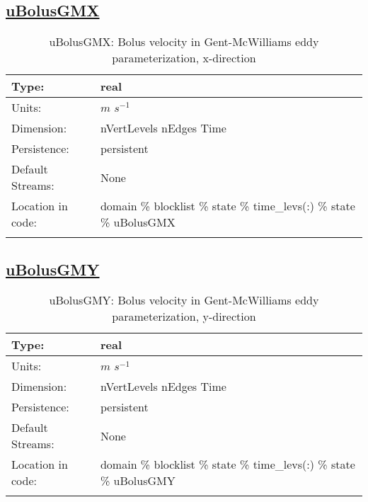 \subsection[uBolusGMX]{\hyperref[sec:var_tab_state]{uBolusGMX}}
\label{subsec:var_sec_state_uBolusGMX}
\begin{center}
\begin{longtable}{| p{2.0in} | p{4.0in} |}
        \hline 
        Type: & real \\
        \hline 
        Units: & $m$ $s^{-1}$ \\
        \hline 
        Dimension: & nVertLevels nEdges Time \\
        \hline 
        Persistence: & persistent \\
        \hline 
		 Default Streams: & None \\
        \hline 
		 Location in code: & domain \% blocklist \% state \% time\_levs(:) \% state \% uBolusGMX \\
		 \hline 
    \caption{uBolusGMX: Bolus velocity in Gent-McWilliams eddy parameterization, x-direction}
\end{longtable}
\end{center}
\subsection[uBolusGMY]{\hyperref[sec:var_tab_state]{uBolusGMY}}
\label{subsec:var_sec_state_uBolusGMY}
\begin{center}
\begin{longtable}{| p{2.0in} | p{4.0in} |}
        \hline 
        Type: & real \\
        \hline 
        Units: & $m$ $s^{-1}$ \\
        \hline 
        Dimension: & nVertLevels nEdges Time \\
        \hline 
        Persistence: & persistent \\
        \hline 
		 Default Streams: & None \\
        \hline 
		 Location in code: & domain \% blocklist \% state \% time\_levs(:) \% state \% uBolusGMY \\
		 \hline 
    \caption{uBolusGMY: Bolus velocity in Gent-McWilliams eddy parameterization, y-direction}
\end{longtable}
\end{center}
